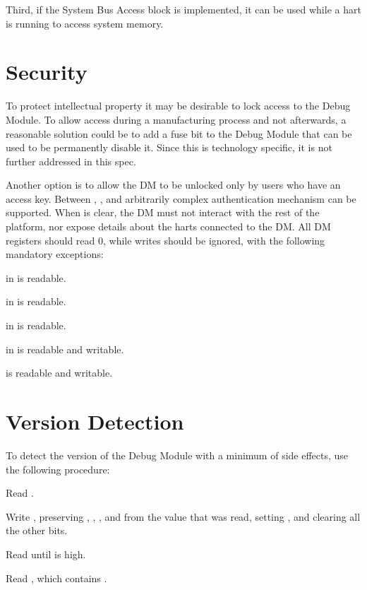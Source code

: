 Third, if the System Bus Access block is implemented, it can be used while a
hart is running to access system memory.

\section{Security}

To protect intellectual property it may be desirable to lock access to the
Debug Module.  To allow access during a manufacturing process and not
afterwards, a reasonable solution could be to add a fuse bit to the Debug
Module that can be used to be permanently disable it. Since this is technology
specific, it is not further addressed in this spec.

Another option is to allow the DM to be unlocked only by users who have an
access key. Between \FdmDmstatusAuthenticated, \FdmDmstatusAuthbusy, and \RdmAuthdata arbitrarily
complex authentication mechanism can be supported.  When \FdmDmstatusAuthenticated is
clear, the DM must not interact with the rest of the platform, nor expose
details about the harts connected to the DM. All DM registers should read 0,
while writes should be ignored, with the following mandatory exceptions:
\begin{steps}{}
    \item \FdmDmstatusAuthenticated in \RdmDmstatus is readable.
    \item \FdmDmstatusAuthbusy in \RdmDmstatus is readable.
    \item \FdmDmstatusVersion in \RdmDmstatus is readable.
    \item \FdmDmcontrolDmactive in \RdmDmcontrol is readable and writable.
    \item \RdmAuthdata is readable and writable.
\end{steps}

\section{Version Detection}

\begin{steps}{To detect the version of the Debug Module with a minimum of side
    effects, use the following procedure:}
    \item Read \RdmDmcontrol.
    \item Write \RdmDmcontrol, preserving \FdmDmcontrolHartreset, \FdmDmcontrolHasel, \FdmDmcontrolHartsello, and
        \FdmDmcontrolHartselhi from the value that was read, setting \FdmDmcontrolDmactive, and
        clearing all the other bits.
    \item Read \RdmDmcontrol until \FdmDmcontrolDmactive is high.
    \item Read \RdmDmstatus, which contains \FdmDmstatusVersion.
\end{steps}

